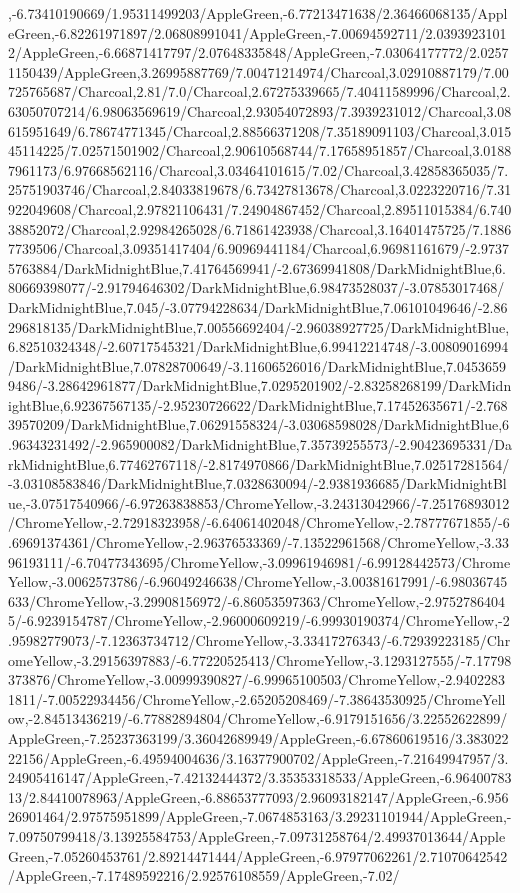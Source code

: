 {\begin{tikzternal}
,-6.73410190669/1.95311499203/AppleGreen,-6.77213471638/2.36466068135/AppleGreen,-6.82261971897/2.06808991041/AppleGreen,-7.00694592711/2.03939231012/AppleGreen,-6.66871417797/2.07648335848/AppleGreen,-7.03064177772/2.02571150439/AppleGreen,3.26995887769/7.00471214974/Charcoal,3.02910887179/7.00725765687/Charcoal,2.81/7.0/Charcoal,2.67275339665/7.40411589996/Charcoal,2.63050707214/6.98063569619/Charcoal,2.93054072893/7.3939231012/Charcoal,3.08615951649/6.78674771345/Charcoal,2.88566371208/7.35189091103/Charcoal,3.01545114225/7.02571501902/Charcoal,2.90610568744/7.17658951857/Charcoal,3.01887961173/6.97668562116/Charcoal,3.03464101615/7.02/Charcoal,3.42858365035/7.25751903746/Charcoal,2.84033819678/6.73427813678/Charcoal,3.0223220716/7.31922049608/Charcoal,2.97821106431/7.24904867452/Charcoal,2.89511015384/6.74038852072/Charcoal,2.92984265028/6.71861423938/Charcoal,3.16401475725/7.18867739506/Charcoal,3.09351417404/6.90969441184/Charcoal,6.96981161679/-2.97375763884/DarkMidnightBlue,7.41764569941/-2.67369941808/DarkMidnightBlue,6.80669398077/-2.91794646302/DarkMidnightBlue,6.98473528037/-3.07853017468/DarkMidnightBlue,7.045/-3.07794228634/DarkMidnightBlue,7.06101049646/-2.86296818135/DarkMidnightBlue,7.00556692404/-2.96038927725/DarkMidnightBlue,6.82510324348/-2.60717545321/DarkMidnightBlue,6.99412214748/-3.00809016994/DarkMidnightBlue,7.07828700649/-3.11606526016/DarkMidnightBlue,7.04536599486/-3.28642961877/DarkMidnightBlue,7.0295201902/-2.83258268199/DarkMidnightBlue,6.92367567135/-2.95230726622/DarkMidnightBlue,7.17452635671/-2.76839570209/DarkMidnightBlue,7.06291558324/-3.03068598028/DarkMidnightBlue,6.96343231492/-2.965900082/DarkMidnightBlue,7.35739255573/-2.90423695331/DarkMidnightBlue,6.77462767118/-2.8174970866/DarkMidnightBlue,7.02517281564/-3.03108583846/DarkMidnightBlue,7.0328630094/-2.9381936685/DarkMidnightBlue,-3.07517540966/-6.97263838853/ChromeYellow,-3.24313042966/-7.25176893012/ChromeYellow,-2.72918323958/-6.64061402048/ChromeYellow,-2.78777671855/-6.69691374361/ChromeYellow,-2.96376533369/-7.13522961568/ChromeYellow,-3.3396193111/-6.70477343695/ChromeYellow,-3.09961946981/-6.99128442573/ChromeYellow,-3.0062573786/-6.96049246638/ChromeYellow,-3.00381617991/-6.98036745633/ChromeYellow,-3.29908156972/-6.86053597363/ChromeYellow,-2.97527864045/-6.9239154787/ChromeYellow,-2.96000609219/-6.99930190374/ChromeYellow,-2.95982779073/-7.12363734712/ChromeYellow,-3.33417276343/-6.72939223185/ChromeYellow,-3.29156397883/-6.77220525413/ChromeYellow,-3.1293127555/-7.17798373876/ChromeYellow,-3.00999390827/-6.99965100503/ChromeYellow,-2.94022831811/-7.00522934456/ChromeYellow,-2.65205208469/-7.38643530925/ChromeYellow,-2.84513436219/-6.77882894804/ChromeYellow,-6.9179151656/3.22552622899/AppleGreen,-7.25237363199/3.36042689949/AppleGreen,-6.67860619516/3.38302222156/AppleGreen,-6.49594004636/3.16377900702/AppleGreen,-7.21649947957/3.24905416147/AppleGreen,-7.42132444372/3.35353318533/AppleGreen,-6.9640078313/2.84410078963/AppleGreen,-6.88653777093/2.96093182147/AppleGreen,-6.95626901464/2.97575951899/AppleGreen,-7.0674853163/3.29231101944/AppleGreen,-7.09750799418/3.13925584753/AppleGreen,-7.09731258764/2.49937013644/AppleGreen,-7.05260453761/2.89214471444/AppleGreen,-6.97977062261/2.71070642542/AppleGreen,-7.17489592216/2.92576108559/AppleGreen,-7.02/
\end{tikzternal}}
